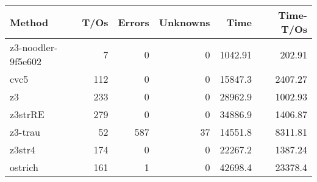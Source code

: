 \begin{tabular}{lrrrrr}
\hline
 Method             &   T/Os &   Errors &   Unknowns &     Time &   Time-T/Os \\
\hline
 z3-noodler-9f5e602 &      7 &        0 &          0 &  1042.91 &      202.91 \\
 cvc5               &    112 &        0 &          0 & 15847.3  &     2407.27 \\
 z3                 &    233 &        0 &          0 & 28962.9  &     1002.93 \\
 z3strRE            &    279 &        0 &          0 & 34886.9  &     1406.87 \\
 z3-trau            &     52 &      587 &         37 & 14551.8  &     8311.81 \\
 z3str4             &    174 &        0 &          0 & 22267.2  &     1387.24 \\
 ostrich            &    161 &        1 &          0 & 42698.4  &    23378.4  \\
\hline
\end{tabular}
